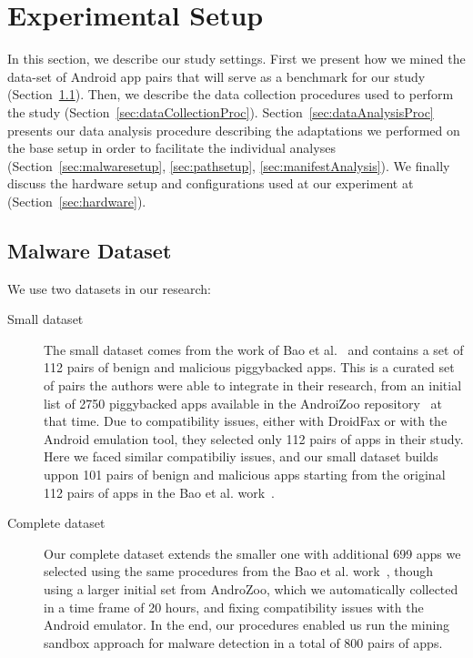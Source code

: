 \section{Experimental Setup}\label{sec:experimentalSetup}


In this section, we describe our study settings. First we present how we mined the data-set of Android app pairs that will serve as a benchmark for our study (Section~\ref{sec:dataset}).  Then, we describe the data collection procedures used to perform the study (Section~\ref{sec:dataCollectionProc}). Section~\ref{sec:dataAnalysisProc} presents our data analysis procedure describing the adaptations we performed on the base setup in order to facilitate the individual analyses (Section~\ref{sec:malwaresetup}, \ref{sec:pathsetup}, \ref{sec:manifestAnalysis}). We finally discuss the hardware setup and configurations used at our experiment at (Section~\ref{sec:hardware}).


\subsection{Malware Dataset}\label{sec:dataset}

We use two datasets in our research:

\begin{description}
\item[Small dataset] The small dataset comes from the work of Bao et al.~\cite{DBLP:conf/wcre/BaoLL18} and contains a set of 112 pairs of benign and malicious piggybacked apps. This is a curated
  set of pairs the authors were able to integrate in their research, from an initial list of \num{2750} piggybacked apps available in the AndroiZoo repository~\cite{DBLP:conf/msr/AllixBKT16} at that time. Due to compatibility
  issues, either with DroidFax or with the Android emulation tool, they selected only 112 pairs of apps in their study. Here we faced similar compatibiliy issues, and our small dataset
  builds uppon 101 pairs of benign and malicious apps starting from the original 112 pairs of apps in the Bao et al. work~\cite{DBLP:conf/wcre/BaoLL18}. 
\item[Complete dataset] Our complete dataset extends the smaller one with additional 699 apps we selected using the same procedures from the Bao et al. work~\cite{DBLP:conf/wcre/BaoLL18}, though
  using a larger initial set from AndroZoo, which we automatically collected in a time frame of 20 hours, and fixing compatibility issues with the Android emulator. In the end,
  our procedures enabled us run the mining sandbox approach for malware detection in a total of 800 pairs of apps.   
\end{description}  
  
